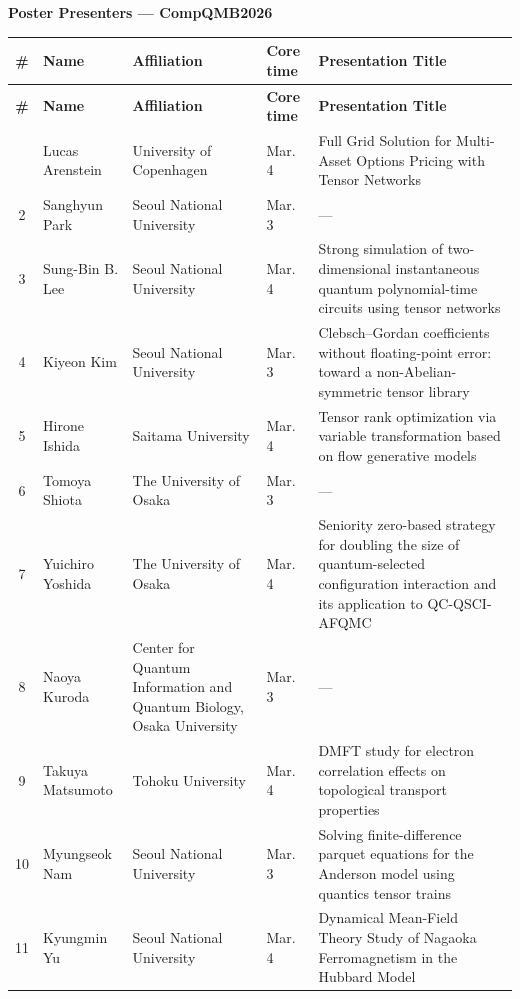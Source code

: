 \documentclass{article}
\begin{document}
\begin{center}
{\Large \textbf{Poster Presenters --- CompQMB2026}}
\end{center}

\vspace{1em}

\begin{longtable}{clp{4.5cm}p{3cm}p{8cm}}
\toprule
\textbf{\#} & \textbf{Name} & \textbf{Affiliation} & \textbf{Core time} & \textbf{Presentation Title} \\
\midrule
\endfirsthead
\toprule
\textbf{\#} & \textbf{Name} & \textbf{Affiliation} & \textbf{Core time} & \textbf{Presentation Title} \\
\midrule
\endhead
\bottomrule
\endfoot
1  & Lucas Arenstein     & University of Copenhagen & Mar. 4 & Full Grid Solution for Multi-Asset Options Pricing with Tensor Networks \\[4pt]
2  & Sanghyun Park       & Seoul National University & Mar. 3 & --- \\[4pt]
3  & Sung-Bin B. Lee     & Seoul National University & Mar. 4 & Strong simulation of two-dimensional instantaneous quantum polynomial-time circuits using tensor networks \\[4pt]
4  & Kiyeon Kim          & Seoul National University & Mar. 3 & Clebsch--Gordan coefficients without floating-point error: toward a non-Abelian-symmetric tensor library \\[4pt]
5  & Hirone Ishida       & Saitama University & Mar. 4 & Tensor rank optimization via variable transformation based on flow generative models \\[4pt]
6  & Tomoya Shiota       & The University of Osaka & Mar. 3 & --- \\[4pt]
7  & Yuichiro Yoshida    & The University of Osaka & Mar. 4 & Seniority zero-based strategy for doubling the size of quantum-selected configuration interaction and its application to QC-QSCI-AFQMC \\[4pt]
8 & Naoya Kuroda        & Center for Quantum Information and Quantum Biology, Osaka University & Mar. 3 & --- \\[4pt]
9 & Takuya Matsumoto    & Tohoku University & Mar. 4 & DMFT study for electron correlation effects on topological transport properties \\[4pt]
10 & Myungseok Nam       & Seoul National University & Mar. 3 & Solving finite-difference parquet equations for the Anderson model using quantics tensor trains \\[4pt]
11 & Kyungmin Yu         & Seoul National University & Mar. 4 & Dynamical Mean-Field Theory Study of Nagaoka Ferromagnetism in the Hubbard Model \\[4pt]

\end{longtable}
\end{document}
